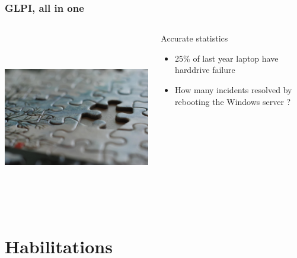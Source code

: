 \documentclass{beamer}
\begin{document}
\begin{frame}


    \frametitle{GLPI, all in one}
 \begin{columns}
 \begin{column}{0.45\textwidth}
         \includegraphics[height=7.5cm]{./pics/glpithelink.jpg}
 \end{column}
 \begin{column}{0.65\textwidth}
    \begin{block}{Accurate statistics}
        \begin{itemize}
            \item 25\% of last year laptop have harddrive failure
            \item How many incidents resolved by rebooting the Windows server ? 
        \end{itemize}

    \end{block}

 \end{column}
\end{columns}
\end{frame}

\section{Habilitations}
\end{document}
